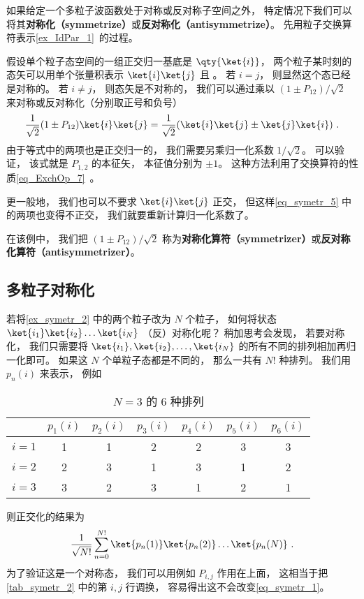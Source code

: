 

如果给定一个多粒子波函数处于对称或反对称子空间之外， 特定情况下我们可以将其\textbf{对称化（symmetrize）}或\textbf{反对称化（antisymmetrize）}。 先用粒子交换算符表示\autoref{ex_IdPar_1}~的过程。

\begin{example}{}\label{ex_symetr_2}
假设单个粒子态空间的一组正交归一基底是 $\qty{\ket{i}}$， 两个粒子某时刻的态矢可以用单个张量积表示 $\ket{i}\ket{j}$ 且 。 若 $i = j$， 则显然这个态已经是对称的。  若 $i \ne j$， 则态矢是不对称的， 我们可以通过乘以 $(1 \pm P_{12})/\sqrt{2}$ 来对称或反对称化（分别取正号和负号）
\begin{equation}\label{eq_symetr_5}
\frac{1}{\sqrt{2}}(1 \pm P_{12})\ket{i}\ket{j} = \frac{1}{\sqrt{2}}(\ket{i}\ket{j} \pm \ket{j}\ket{i})~.
\end{equation}
由于等式中的两项也是正交归一的， 我们需要另乘归一化系数 $1/\sqrt 2$。 可以验证， 该式就是 $P_{1,2}$ 的本征矢， 本征值分别为 $\pm 1$。 这种方法利用了交换算符的性质\autoref{eq_ExchOp_7}~。

更一般地， 我们也可以不要求 $\ket{i}\ket{j}$ 正交， 但这样\autoref{eq_symetr_5} 中的两项也变得不正交， 我们就要重新计算归一化系数了。
\end{example}

在该例中， 我们把 $(1 \pm P_{12})/\sqrt{2}$ 称为\textbf{对称化算符（symmetrizer）}或\textbf{反对称化算符（antisymmetrizer）}。

\subsection{多粒子对称化}
若将\autoref{ex_symetr_2} 中的两个粒子改为 $N$ 个粒子， 如何将状态 $\ket{i_1}\ket{i_2}\dots\ket{i_N}$ （反）对称化呢？ 稍加思考会发现， 若要对称化， 我们只需要将 $\ket{i_1},\ket{i_2},\dots,\ket{i_N}$ 的所有不同的排列相加再归一化即可。 如果这 $N$ 个单粒子态都是不同的， 那么一共有 $N!$ 种排列。 我们用 $p_n(i)$ 来表示， 例如
\begin{table}[ht]
\centering
\caption{$N = 3$ 的 6 种排列}\label{tab_symetr_2}
\begin{tabular}{|c|c|c|c|c|c|c|}
\hline
  & $p_1(i)$ & $p_2(i)$ & $p_3(i)$ & $p_4(i)$ & $p_5(i)$ & $p_6(i)$ \\
\hline
$i=1$ & 1 & 1 & 2 & 2 & 3 & 3 \\
\hline
$i=2$ & 2 & 3 & 1 & 3 & 1 & 2 \\
\hline
$i=3$ & 3 & 2 & 3 & 1 & 2 & 1 \\
\hline
\end{tabular}
\end{table}
则正交化的结果为
\begin{equation}\label{eq_symetr_1}
\frac{1}{\sqrt{N!}}\sum_{n = 0}^{N!} \ket{p_n(1)}\ket{p_n(2)}\dots\ket{p_n(N)}~.
\end{equation}
为了验证这是一个对称态， 我们可以用例如 $P_{i,j}$ 作用在上面， 这相当于把\autoref{tab_symetr_2} 中的第 $i,j$ 行调换， 容易得出这不会改变\autoref{eq_symetr_1}。

